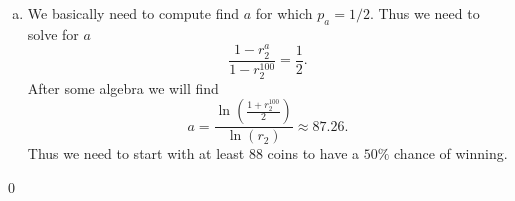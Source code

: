 \begin{solution}
\begin{enumerate}[(a)]
		\item  We basically need to compute find $a$ for which $p_a = 1/2$. Thus we need to solve for $a$
		\[ \frac{1-r_2^a}{1-r_2^{100}} = \frac{1}{2}. \]
		After some algebra we will find
		\[  \boxed{a = \frac{\ln(\frac{1+r_2^{100}}{2})}{\ln(r_2)} \approx 87.26}.  \]
		Thus we need to start with at least 88 coins to have a $50\%$ chance of winning.
	\end{enumerate}
	
	\qed

	
\end{solution}
